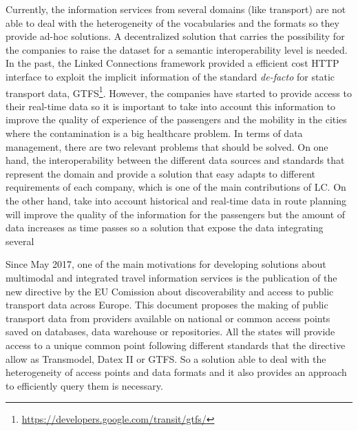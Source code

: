 \documentclass[sw]{iosart2x}
\begin{document}
Currently, the information services from several domains (like transport) are not able to deal with the heterogeneity of the vocabularies and the formats so they provide ad-hoc solutions. A decentralized solution that carries the possibility for the companies to raise the dataset for a semantic interoperability level is needed. In the past, the Linked Connections\cite{colpaert2015intermodal} framework provided a efficient cost HTTP interface to exploit the implicit information of the standard \textit{de-facto} for static transport data, GTFS\footnote{\url{https://developers.google.com/transit/gtfs/}}. However, the companies have started to provide access to their real-time data so it is important to take into account this information to improve the quality of experience of the passengers and the mobility in the cities where the contamination is a big healthcare problem. In terms of data management, there are two relevant problems that should be solved. On one hand, the interoperability between the different data sources and standards that represent the domain and provide a solution that easy adapts to different requirements of each company, which is one of the main contributions of LC. On the other hand, take into account historical and real-time data in route planning will improve the quality of the information for the passengers but the amount of data increases as time passes so a solution that expose the data integrating several 

Since May 2017, one of the main motivations for developing solutions about multimodal and integrated travel information services is the publication of the new directive by the EU Comission about discoverability and access to public transport data across Europe. This document proposes the making of public transport data from providers available on national or common access points saved on databases, data warehouse or repositories. All the states will provide access to a unique common point following different standards that the directive allow as Transmodel, Datex II or GTFS. So a solution able to deal with the heterogeneity of access points and data formats and it also provides an approach to efficiently query them is necessary.
\end{document}
